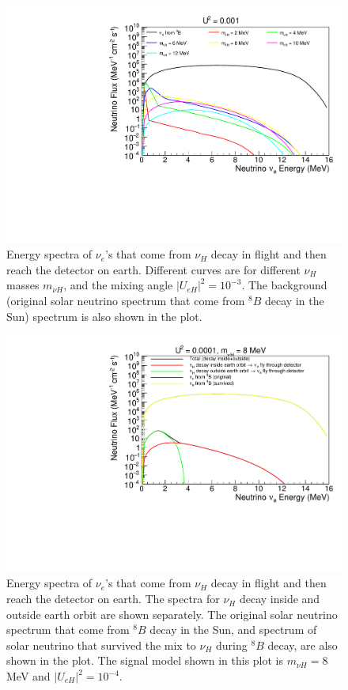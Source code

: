 \documentclass[%
 reprint,
 amsmath,amssymb,
 aps,
 prd,
floatfix,
twocolumn,
]{revtex4-1}
\begin{document}
\begin{figure}[!htbp]
\includegraphics[width=0.99\columnwidth]{../plots/DecayInFlightNuLEnergy_U0.001_AllMass_linXlogY.pdf}
\caption{Energy spectra of $\nu_e$'s that come from $\nu_H$ decay in flight and then reach the detector on earth. Different curves are for different $\nu_H$ masses $m_{\nu H}$, and the mixing angle $|U_{eH}|^2 = 10^{-3}$. 
The background (original solar neutrino spectrum that come from $^8 B$ decay in the Sun) spectrum is also shown in the plot.}
\label{fig:DecayInFlightSpectrum_U1em3_AllMass}
\end{figure}


\begin{figure}[!htbp]
\includegraphics[width=0.99\columnwidth]{../plots/DecayInFlightNuLEnergy_U0.0001_M8.0_InsideOutside_linXlogY.pdf}
\caption{Energy spectra of $\nu_e$'s that come from $\nu_H$ decay in flight and then reach the detector on earth. The spectra for $\nu_H$ decay inside and outside earth orbit are shown separately. 
The original solar neutrino spectrum that come from $^8 B$ decay in the Sun, and spectrum of solar neutrino that survived the mix to $\nu_H$ during $^{8}B$ decay, are also shown in the plot. The signal model shown in this plot is $m_{\nu H} = 8$ MeV and $|U_{eH}|^2 = 10^{-4}$.}
\label{fig:DecayInFlightSpectrum_U1em4_M8} 
\end{figure}
\end{document}
